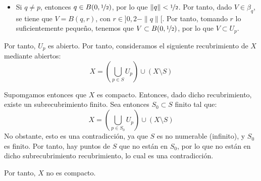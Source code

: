 \documentclass[12pt]{article}
\begin{document}
\begin{ejercicio}[5 puntos]
\begin{enumerate}
\begin{itemize}
            \item Si $q\neq p$, entonces $q\in B(0, \nicefrac{1}{2})$, por lo que $\|q\|<\nicefrac{1}{2}$.
            Por tanto, dado $V\in \beta_q$, se tiene que $V=B(q,r)$, con $r\in ]0,2-\|q\|[$. Por tanto, tomando $r$
            lo suficientemente pequeño, tenemos que $V\subset B(0, \nicefrac{1}{2})$, por lo que $V\subset U_p$.
          \end{itemize}

          Por tanto, $U_p$ es abierto. Por tanto, consideramos el siguiente recubrimiento de $X$ mediante abiertos:
          \begin{equation*}
            X = \left(\bigcup_{p\in S} U_p\right) \cup (X\setminus S)
          \end{equation*}

          Supomgamos entonces que $X$ es compacto. Entonces, dado dicho recubrimiento, existe un subrecubrimiento finito.
          Sea entonces $S_0\subset S$ finito tal que:
          \begin{equation*}
            X = \left(\bigcup_{p\in S_0} U_p\right) \cup (X\setminus S)
          \end{equation*}
          No obstante, esto es una contradicción, ya que $S$ es no numerable (infinito), y $S_0$ es finito. Por tanto,
          hay puntos de $S$ que no están en $S_0$, por lo que no están en dicho subrecubrimiento recubrimiento, lo cual es una contradicción.

          Por tanto, $X$ no es compacto.
        \end{enumerate}

    \end{ejercicio}
\end{document}
